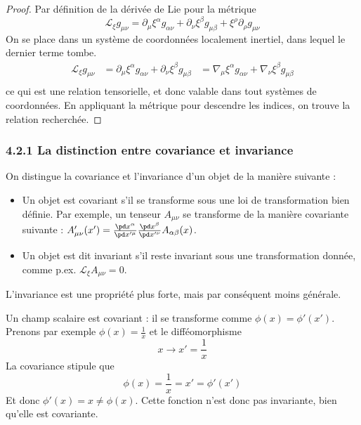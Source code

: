 \begin{proof}
    Par définition de la dérivée de Lie pour la métrique 
    \begin{equation}
        \mathcal{L}_{\xi}g_{\mu \nu} = \partial_{\mu}\xi^{\alpha}g_{\alpha \nu} + \partial_{\nu}\xi^{\beta}g_{\mu \beta} + \xi^{\rho}\partial_{\rho}g_{\mu \nu}
        \label{eq:dérivée de Lie}
    \end{equation}
    On se place dans un système de coordonnées localement inertiel, dans lequel le dernier terme tombe. 
    \begin{align}
        \mathcal{L}_{\xi}g_{\mu \nu} &= \partial_{\mu}\xi^{\alpha}g_{\alpha \nu} + \partial_{\nu}\xi^{\beta}g_{\mu \beta}
        &=\nabla_{\mu}\xi^{\alpha}g_{\alpha \nu} + \nabla_{\nu}\xi^{\beta}g_{\mu \beta}\\
    \end{align}
    ce qui est une relation tensorielle, et donc valable dans tout systèmes de coordonnées. En appliquant la métrique pour descendre les indices, on trouve la relation recherchée.
\end{proof}


\subsubsection{4.2.1 La distinction entre covariance et invariance}
On distingue la covariance et l'invariance d'un objet de la manière suivante :
\begin{itemize}
    \item Un objet est covariant s'il se transforme sous une loi de transformation bien définie. Par exemple, un tenseur $A_{\mu\nu}$ se transforme de la manière covariante suivante : $A'_{\mu\nu}(x') = \frac{\pd x^\alpha}{\pd x'^\mu}\frac{\pd x^\beta}{\pd x'^\nu} A_{\alpha\beta}(x)$.
    \item Un objet est dit invariant s'il reste invariant sous une transformation donnée, comme p.ex. $\mathcal{L}_\xi A_{\mu\nu} = 0$.
\end{itemize}
L'invariance est une propriété plus forte, mais par conséquent moins générale. 

\begin{exmp}
    Un champ scalaire est covariant : il se transforme comme $\phi(x) = \phi'(x')$. Prenons par exemple $\phi(x) = \frac{1}{x}$ et le difféomorphisme
    \begin{equation}
        x \to x' = \frac{1}{x}
    \end{equation}
    La covariance stipule que
    \begin{equation}
        \phi(x) = \frac{1}{x} = x' = \phi'(x')
    \end{equation}
    Et donc $\phi'(x) = x \neq \phi(x)$. Cette fonction n'est donc pas invariante, bien qu'elle est covariante.
\end{exmp}
